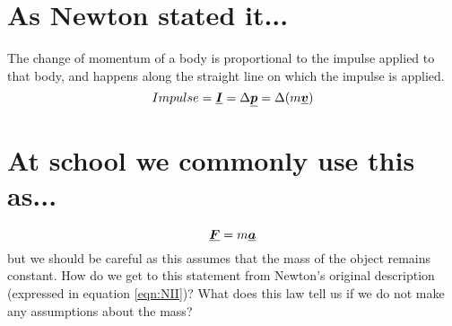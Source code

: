 





\addtolength{\topmargin}{-0.7 cm}
\setlength{\columnsep}{22pt}

\section{As Newton stated it...}
The change of momentum of a body is proportional to the impulse applied to that body, and happens along the straight line on which the impulse is applied.
\begin{equation}
Impulse=\mathit{\underline{\boldsymbol{I}}} = \Delta{\mathit{\underline{\boldsymbol{p}}}} = \Delta(m \mathit{\underline{\boldsymbol{v}}}) \label{eqn:NII}
\end{equation}

\section{At school we commonly use this as...}
\begin{equation}
{\mathit{\underline{\boldsymbol{F}}}}=m{\mathit{\underline{\boldsymbol{a}}}}
\end{equation}
but we should be careful as this assumes that the mass of the object remains constant.  How do we get to this statement from Newton's original description (expressed in equation \ref{eqn:NII})?  What does this law tell us if we do not make any assumptions about the mass? 
